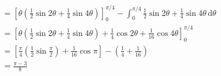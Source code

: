 \documentclass[12pt, a4 paper]{article}
\begin{document}
\begin{outline}[enumerate]
\begin{answer}
\begin{align*}
			                                                                & = [\theta(\frac{1}{2}\sin{2\theta} + \frac{1}{4}\sin{4\theta})]_0^{\pi/4}-\int_0^{\pi/4} \frac{1}{2}\sin{2\theta} + \frac{1}{4}\sin{4\theta}\,\mathrm{d}\theta \\
			                                                                & =[\theta(\frac{1}{2}\sin{2\theta} + \frac{1}{4}\sin{4\theta}) + \frac{1}{4}\cos{2\theta} + \frac{1}{16}\cos{4\theta}]_0^{\pi/4}                                \\
			                                                                & = [\frac{\pi}{4}(\frac{1}{2}\sin{\frac{\pi}{2}})+ \frac{1}{16}\cos{\pi}]- (\frac{1}{4}+\frac{1}{16})                                                           \\
			                                                                & = \frac{\pi-3}{8}                                                                                                                                              
		\end{align*}
	\end{answer}   
		

\end{outline}
\end{document}
